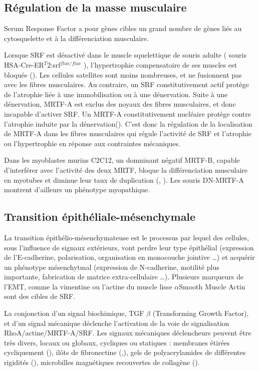 \documentclass{report}
\begin{document}
\subsection{Régulation de la masse musculaire}

Serum Response Factor a pour gènes cibles un grand nombre de gènes liés au cytosquelette et à la différenciation musculaire. 

Lorsque SRF est désactivé dans le muscle squelettique de souris adulte ( souris HSA-Cre-ER$^T2$:srf$^{flox/flox}$ ), l'hypertrophie compensatoire de ses muscles est bloquée (\cite{guerci_srf-dependent_2012}). Les cellules satellites sont moins nombreuses, et ne fusionnent pas avec les fibres musculaires. Au contraire, un SRF constitutivement actif protège de l'atrophie liée à une immobilisation ou à une dénervation. 
Suite à une dénervation, MRTF-A est exclus des noyaux des fibres musculaires, et donc incapable d'activer SRF. Un MRTF-A constitutivement nucléaire protège contre l'atrophie induite par la dénervation(\cite{collard_nuclear_2014}). C'est donc la régulation de la localisation de MRTF-A dans les fibres musculaires qui régule l'activité de SRF et l'atrophie ou l'hypertrophie en réponse aux contraintes mécaniques.  


Dans les myoblastes murins C2C12, un domninant négatif MRTF-B, capable d'interférer avec l'activité des deux MRTF, bloque la différenciation musculaire en myotubes et diminue leur taux de duplication (\cite{selvaraj_megakaryoblastic_2003}, \cite{cen_megakaryoblastic_2003}). 
Les souris DN-MRTF-A montrent d'ailleurs un phénotype myopathique. 




\subsection{Transition épithéliale-mésenchymale}

La transition épithélio-mésenchymateuse est le processus par lequel des cellules, sous l'influence de signaux extérieurs, vont perdre leur type épithélial (expression de l'E-cadherine, polarisation, organisation en monocouche jointive \dots) et acquérir un phénotype mésenchytmal (expression de N-cadherine, motilité plus importante, fabrication de matrice extra-cellulaire \dots). 
Plusieurs marqueurs de l'EMT, comme la vimentine ou l'actine du muscle lisse $\alpha$Smooth Muscle Actin sont des cibles de SRF. 

La conjonction d'un signal biochimique, TGF $\beta$ (Transforming Growth Factor), et d'un signal mécanique déclenche l'activation de la voie de signalisation RhoA/actine/MRTF-A/SRF. 
Les signaux mécaniques déclencheurs peuvent être très divers, locaux ou globaux, cycliques ou statiques : membranes étirées cycliquement (\cite{maier_tenascin-c_2008}), ilôts de fibronectine  (\cite{gomez_tissue_2010},\cite{connelly_actin_2010}), gels de polyacrylamides de différentes rigidités (\cite{huang_matrix_2012}), microbilles magnétiques recouvertes de collagène (\cite{chan_force-induced_2010}). 
\end{document}
